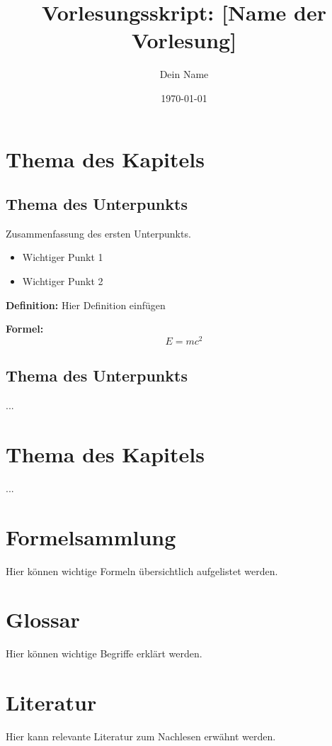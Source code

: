 \documentclass[10pt]{article}
\title{Vorlesungsskript: [Name der Vorlesung]}
\author{Dein Name}
\date{\today}
\begin{document}
\maketitle %
\tableofcontents %

\newpage %

\section{Thema des Kapitels}

\subsection{Thema des Unterpunkts}

Zusammenfassung des ersten Unterpunkts.

\begin{itemize}
    \item Wichtiger Punkt 1
    \item Wichtiger Punkt 2
\end{itemize}

\textbf{Definition:} Hier Definition einfügen

\textbf{Formel:}
\[
    E = mc^2
\]

\subsection{Thema des Unterpunkts}

...

\section{Thema des Kapitels}

...

\appendix
\section{Formelsammlung}

Hier können wichtige Formeln übersichtlich aufgelistet werden.

\section{Glossar}

Hier können wichtige Begriffe erklärt werden.

\section{Literatur}

Hier kann relevante Literatur zum Nachlesen erwähnt werden.

\end{document}
